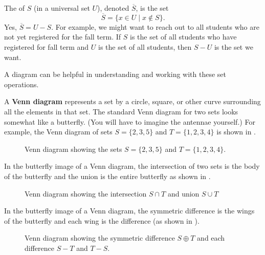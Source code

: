 \begin{defn}
\begin{apart}
            \item The  of $S$ (in a universal set $U$), denoted $\overline{S}$, is the set
                $$\overline{S}= \{ x \in U \mid x \notin S\}.$$
            Yes, $\overline{S}=U-S$.  For example, we might want to reach out to all students who are not yet registered for the fall term. If $S$ is the set of all students who have registered for fall term and $U$ is the set of all students, then $S-U$ is the set we want.
        \end{apart}
\end{defn}

A diagram can be helpful in understanding and working with these set operations.

\begin{defn}
\label{defn_venn_diagram}
    A \textbf{Venn diagram} represents a set by a circle, square, or other curve surrounding all the elements in that set.  The standard Venn diagram for two sets looks somewhat like a butterfly.  (You will have to imagine the antennae yourself.) For example, the Venn diagram of sets $S = \{2,3,5\}$ and $T = \{1,2,3,4\}$ is shown in .

    \begin{figure} [hbtp]
    \centering
    
    \caption{Venn diagram showing the sets $S=\{2,3,5\}$ and $T=\{1,2,3,4\}$.}
    \label{fig_venn_specific}
\end{figure}
\end{defn}

In the butterfly image of a Venn diagram, the intersection of two sets is the body of the butterfly and the union is the entire butterfly as shown in . 

\begin{figure}[hbtp]
    \centering
    
    \caption{Venn diagram showing the intersection $S \cap T$ and union $S \cup T$}
    \label{fig_venn_int_union}
\end{figure}

In the butterfly image of a Venn diagram, the symmetric difference is the wings of the butterfly and each wing is the difference (as shown in ).

\begin{figure}[hbtp]
    \centering
    
    \caption{Venn diagram showing the symmetric difference $S \oplus T$ and each difference $S-T$ and $T-S$.}
    \label{fig_venn_diff}
\end{figure}

